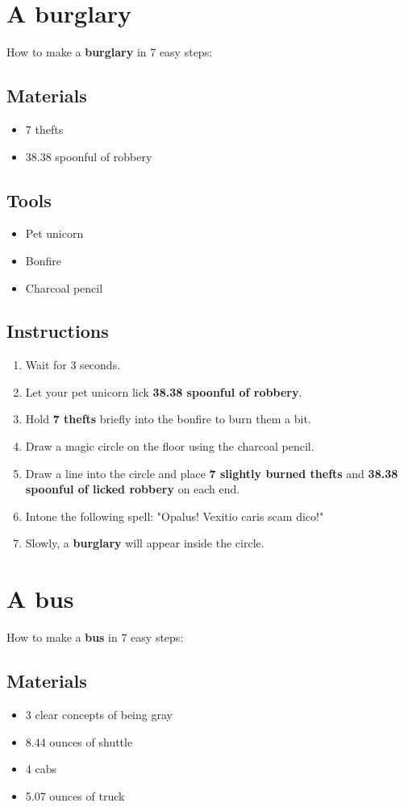 \documentclass{article}
\begin{document}
\section{A burglary}How to make a \textbf{burglary} in 7 easy steps:

\subsection{Materials}\begin{itemize}
\item 
7 thefts
\item 
38.38 spoonful of robbery
\end{itemize}
\subsection{Tools}\begin{itemize}
\item 
Pet unicorn
\item 
Bonfire
\item 
Charcoal pencil
\end{itemize}
\subsection{Instructions}\begin{enumerate}
\item 
Wait for 3 seconds.
\item 
Let your pet unicorn lick \textbf{38.38 spoonful of robbery}.
\item 
Hold \textbf{7 thefts} briefly into the bonfire to burn them a bit.
\item 
Draw a magic circle on the floor using the charcoal pencil.
\item 
Draw a line into the circle and place \textbf{7 slightly burned thefts} and \textbf{38.38 spoonful of licked robbery} on each end.
\item 
Intone the following spell: "Opalus! Vexitio caris scam dico!"
\item 
Slowly, a \textbf{burglary} will appear inside the circle.
\end{enumerate}
\newpage
\section{A bus}How to make a \textbf{bus} in 7 easy steps:

\subsection{Materials}\begin{itemize}
\item 
3 clear concepts of being gray
\item 
8.44 ounces of shuttle
\item 
4 cabs
\item 
5.07 ounces of truck
\end{itemize}
\end{document}
